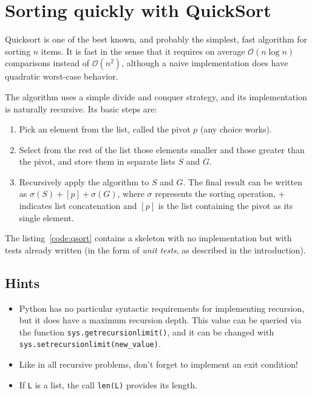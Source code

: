 
\section{Sorting quickly with QuickSort }

Quicksort is one of the best known, and probably the simplest, fast
algorithm for sorting $n$ items. It is fast in the sense that it
requires on average $\mathcal{O}(n\log n)$ comparisons instead of
$\mathcal{O}(n^{2})$, although a naive implementation does have quadratic
worst-case behavior.

The algorithm uses a simple divide and conquer strategy, and its implementation
is naturally recursive. Its basic steps are:

\begin{enumerate}
\item Pick an element from the list, called the pivot $p$ (any choice works).
\item Select from the rest of the list those elements smaller and those
greater than the pivot, and store them in separate lists $S$ and
$G$.
\item Recursively apply the algorithm \texttt{}to $S$ and $G$. The final
result can be written as $\sigma(S)+[p]+\sigma(G)$, where $\sigma$
represents the sorting operation, $+$ indicates list concatenation
and $[p]$ is the list containing the pivot as its single element.
\end{enumerate}
The listing~\ref{code:qsort} contains a skeleton with no implementation
but with tests already written (in the form of \emph{unit tests},
as described in the introduction).




\subsection*{Hints}

\begin{itemize}
\item Python has no particular syntactic requirements for implementing recursion,
but it does have a maximum recursion depth. This value can be queried
via the function \texttt{sys.getrecursionlimit()}, and it can be changed
with \texttt{sys.setrecursionlimit(new\_value)}. 
\item Like in all recursive problems, don't forget to implement an exit
condition!
\item If \texttt{L} is a list, the call \texttt{len(L)} provides its length.
\end{itemize}

